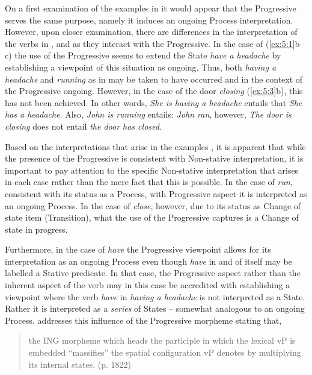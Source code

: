 On a first examination of the examples in  it would appear that the Progressive serves the same purpose, namely it induces an ongoing Process interpretation. However, upon closer examination, there are differences in the interpretation of the verbs in ,  and  as they interact with the Progressive. In the case of (\ref{ex:5:1}b--c) the use of the Progressive seems to extend the State \textit{have a headache} by establishing a viewpoint of this situation as ongoing. Thus, both \textit{having a headache} and \textit{running} as in  may be taken to have occurred and in the context of the Progressive ongoing. However, in the case of the door \textit{closing} (\ref{ex:5:3}b), this has not been achieved. In other words, \textit{She is having a headache} entails that \textit{She has a headache}. Also, \textit{John is running} entails: \textit{John ran}, however, \textit{The door is closing} does not entail \textit{the door has closed.} 

Based on the interpretations that arise in the examples , it is apparent that while the presence of the Progressive is consistent with Non-stative interpretation, it is important to pay attention to the specific Non-stative interpretation that arises in each case rather than the mere fact that this is possible. In the case of \textit{run}, consistent with its status as a Process, with Progressive aspect it is interpreted as an ongoing Process. In the case of \textit{close}, however, due to its status as Change of state item (Transition), what the use of the Progressive captures is a Change of state in progress. 

Furthermore, in the case of \textit{have} the Progressive viewpoint allows for its interpretation as an ongoing Process even though \textit{have} in and of itself may be labelled a Stative predicate. In that case, the Progressive aspect rather than the inherent aspect of the verb may in this case be accredited with establishing a viewpoint where the verb \textit{have} in \textit{having a headache} is not interpreted as a State. Rather it is interpreted as a \textit{series} of States -- somewhat analogous to an ongoing Process. \citet{Guéron2008} addresses this influence of the Progressive morpheme stating that, 

\begin{quote}
the ING morpheme which heads the participle in which the lexical vP is embedded ``massifies'' the spatial configuration vP denotes by multiplying its internal states. (p. 1822)
\end{quote}

